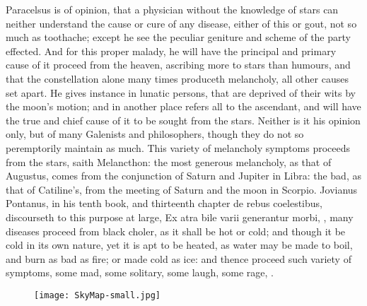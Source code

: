 {{Paracelsus is of opinion, that a physician without the knowledge
of stars can neither understand the cause or cure of any disease,
either of this or gout, not so much as toothache; except he see the
peculiar geniture and scheme of the party effected. And for this proper
malady, he will have the principal and primary cause of it proceed from
the heaven, ascribing more to stars than humours, and that the
constellation alone many times produceth melancholy, all other causes
set apart. He gives instance in lunatic persons, that are deprived of
their wits by the moon's motion; and in another place refers all to the
ascendant, and will have the true and chief cause of it to be sought
from the stars. Neither is it his opinion only, but of many Galenists
and philosophers, though they do not so peremptorily maintain as much.
This variety of melancholy symptoms proceeds from the stars, saith
Melancthon: the most generous melancholy, as that of Augustus,
comes from the conjunction of Saturn and Jupiter in Libra: the bad, as
that of Catiline's, from the meeting of Saturn and the moon in Scorpio.
Jovianus Pontanus, in his tenth book, and thirteenth chapter de rebus
coelestibus, discourseth to this purpose at large, Ex atra bile varii
generantur morbi, \etc{}, many diseases proceed from black choler,
as it shall be hot or cold; and though it be cold in its own nature,
yet it is apt to be heated, as water may be made to boil, and burn as
bad as fire; or made cold as ice: and thence proceed such variety of
symptoms, some mad, some solitary, some laugh, some rage, \etc{}.

\begin{figure}[p]
  \begingroup
  \centering
  \texttt{[image: SkyMap-small.jpg]}
  \label{fig:skymap}
\end{figure}

}}
